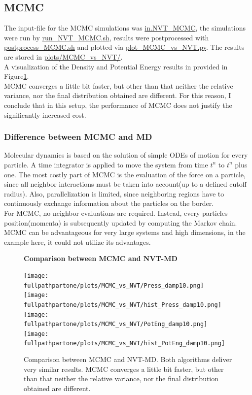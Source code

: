 \documentclass[10pt,a4paper]{report}
\def \pathpartone {../../1_three-dimensional_atomic_system}
\def \fullpathpartone {/home/lukas/Desktop/project/independence/atomistic_modeling/exam/1_three-dimensional_atomic_system}
\newcommand*{\figuretitle}[1]{%
    {\centering%
    \textbf{#1}%
    \par\medskip}%
}
\begin{document}
\subsection{MCMC}
The input-file for the MCMC simulations was \href{\pathpartone/in.NVT_MCMC}{in.NVT\_MCMC}, the simulations were run by \href{\pathpartone/run_NVT_MCMC.sh}{run\_NVT\_MCMC.sh}, results were postprocessed with \href{\pathpartone/postprocess_MCMC.sh}{postprocess\_MCMC.sh} and plotted via \href{\pathpartone/plot_MCMC_vs_NVT.py}{plot\_MCMC\_vs\_NVT.py}.
The results are stored in \href{\pathpartone/plots/MCMC_vs_NVT/}{plots/MCMC\_vs\_NVT/}.\\
A visualization of the Density and Potential Energy results in provided in Figure\ref{fig:p1_MCMC_vs_NVT}.\\
MCMC converges a little bit faster, but other than that neither the relative variance, nor the final distribution obtained are different. For this reason, I conclude that in this setup, the performance of MCMC does not justify the significantly increased cost.

\subsubsection{Difference between MCMC and MD}
Molecular dynamics is based on the solution of simple ODEs of motion for every particle. A time integrator is applied to move the system from time $t^n$ to $t^n$ plus one. The most costly part of MCMC is the evaluation of the force on a particle, since all neighbor interactions must be taken into account(up to a defined cutoff radius). Also, parallelization is limited, since neighboring regions have to continuously exchange information about the particles on the border.\\
For MCMC, no neighbor evaluations are required. Instead, every particles position(momenta) is subsequently updated by computing the Markov chain. MCMC can be advantageous for very large systems and high dimensions, in the example here, it could not utilize its advantages.


\begin{center}
\begin{figure}[h]
\figuretitle{Comparison between MCMC and NVT-MD}
\texttt{[image: \\fullpathpartone/plots/MCMC\_vs\_NVT/Press\_damp10.png]}~
\texttt{[image: \\fullpathpartone/plots/MCMC\_vs\_NVT/hist\_Press\_damp10.png]}
\texttt{[image: \\fullpathpartone/plots/MCMC\_vs\_NVT/PotEng\_damp10.png]}~
\texttt{[image: \\fullpathpartone/plots/MCMC\_vs\_NVT/hist\_PotEng\_damp10.png]}
\caption[Comparison between MCMC and NVT-MD]{Comparison between MCMC and NVT-MD. Both algorithms deliver very similar results. MCMC converges a little bit faster, but other than that neither the relative variance, nor the final distribution obtained are different.}
\label{fig:p1_MCMC_vs_NVT}
\end{figure}
\end{center}
\end{document}
